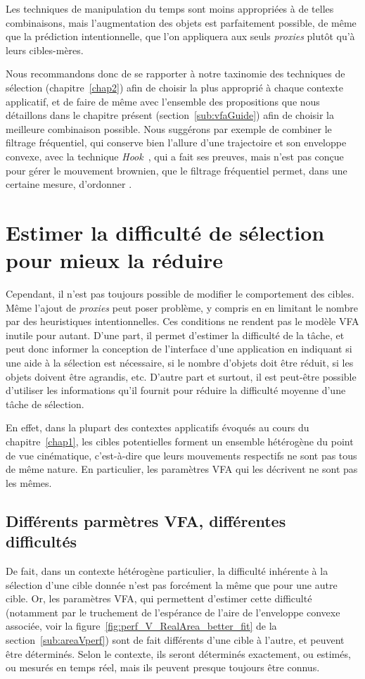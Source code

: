 	Les techniques de manipulation du temps sont moins appropriées à de telles combinaisons, mais l'augmentation des objets est parfaitement possible, de même que la prédiction intentionnelle, que l'on appliquera aux seuls \emph{proxies} plutôt qu'à leurs cibles-mères.
	
	Nous recommandons donc de se rapporter à notre taxinomie des techniques de sélection (chapitre~\ref{chap2}) afin de choisir la plus approprié à chaque contexte applicatif, et de faire de même avec l'ensemble des propositions que nous détaillons dans le chapitre présent (section~\ref{sub:vfaGuide}) afin de choisir la meilleure combinaison possible. Nous suggérons par exemple de combiner le filtrage fréquentiel, qui conserve bien l'allure d'une trajectoire et son enveloppe convexe, avec la technique \emph{Hook}~\cite{ortega2013hook}, qui a fait ses preuves, mais n'est pas conçue pour gérer le mouvement brownien, que le filtrage fréquentiel permet, dans une certaine mesure, \og d'ordonner \fg{}.

\section{Estimer la difficulté de sélection pour mieux la réduire}
	Cependant, il n'est pas toujours possible de modifier le comportement des cibles. Même l'ajout de \emph{proxies} peut poser problème, y compris en en limitant le nombre par des heuristiques intentionnelles. Ces conditions ne rendent pas le modèle VFA inutile pour autant. D'une part, il permet d'estimer la difficulté de la tâche, et peut donc informer la conception de l'interface d'une application en indiquant si une aide à la sélection est nécessaire, si le nombre d'objets doit être réduit, si les objets doivent être agrandis, etc. D'autre part et surtout, il est peut-être possible d'utiliser les informations qu'il fournit pour réduire la difficulté moyenne d'une tâche de sélection.
	
	En effet, dans la plupart des contextes applicatifs évoqués au cours du chapitre~\ref{chap1}, les cibles potentielles forment un ensemble hétérogène du point de vue cinématique, c'est-à-dire que leurs mouvements respectifs ne sont pas tous de même nature. En particulier, les paramètres VFA qui les décrivent ne sont pas les mêmes.
	
	\subsection{Différents parmètres VFA, différentes difficultés}
	De fait, dans un contexte hétérogène particulier, la difficulté inhérente à la sélection d'une cible donnée n'est pas forcément la même que pour une autre cible. Or, les paramètres VFA, qui permettent d'estimer cette difficulté (notamment par le truchement de l'espérance de l'aire de l'enveloppe convexe associée, voir la figure~\ref{fig:perf_V_RealArea_better_fit} de la section~\ref{sub:areaVperf}) sont de fait différents d'une cible à l'autre, et peuvent être déterminés. Selon le contexte, ils seront déterminés exactement, ou estimés, ou mesurés en temps réel, mais ils peuvent presque toujours être connus.
	

